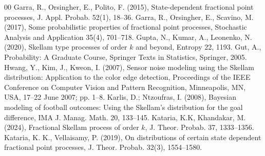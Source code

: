 \documentclass[12pt, twoside, english, headsepline]{article}
\theoremstyle{definition} %
\numberwithin{equation}{section} %
\begin{document}
{\begin{thebibliography}{00}
Garra, R., Orsingher, E., Polito, F. (2015), State-dependent fractional point processes, J.
Appl. Probab. 52(1), 18--36.
%
Garra, R., Orsingher, E., Scavino, M. (2017), Some probabilistic properties of fractional point processes, Stochastic Analysis and Application 35(4), 701--718.
%
%
%
%
%
Gupta, N., Kumar, A., Leonenko, N. (2020), Skellam type processes of order $k$ and beyond, Entropy 22, 1193.
%
Gut, A., Probability: A Graduate Course, Springer Texts in Statistics, Springer, 2005.
%
Hwang, Y., Kim, J., Kweon, I. (2007), Sensor noise modeling using the Skellam distribution: Application to the color edge detection, Proceedings of the IEEE Conference on Computer Vision and Pattern Recognition, Minneapolis, MN, USA, 17–22 June 2007; pp. 1–8.
%
Karlis, D.; Ntzoufras, I. (2008), Bayesian modeling of football outcomes: Using the Skellam’s distribution for the goal difference, IMA J. Manag. Math. 20, 133–145.
%
Kataria, K.K, Khandakar, M. (2024), Fractional Skellam process of order $k$, J. Theor. Probab. 37, 1333--1356.
%
Kataria, K. K., Vellaisamy, P. (2019), On distributions of certain state dependent fractional
point processes, J. Theor. Probab. 32(3), 1554--1580.


\end{thebibliography}}
\end{document}
